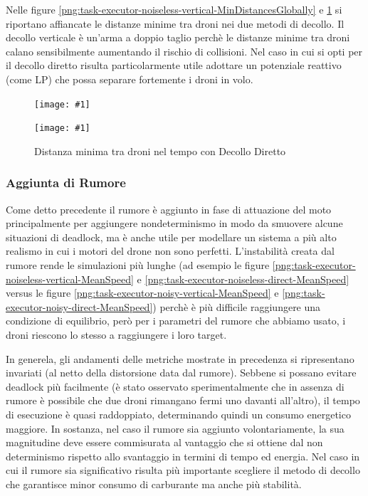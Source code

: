 \documentclass[a4paper,11pt,oneside, table]{article}
\newcommand{\putsubimage}[5] {
  \begin{minipage}{{#4}\linewidth}
	    \centering
      \texttt{[image: \#1]}
	    \caption{#2}\label{#3}
	\end{minipage}
}
\newcommand{\putimagecouple}[2] {
  \begin{figure}[!htb]
      \centering
      #1
      \hspace{0.5cm}
      #2
  \end{figure}
}
\begin{document}
Nelle figure \ref{png:task-executor-noiseless-vertical-MinDistancesGlobally} e \ref{png:task-executor-noiseless-direct-MinDistancesGlobally} si riportano affiancate le distanze minime tra droni nei due metodi di decollo.
Il decollo verticale \`e un'arma a doppio taglio perch\`e le distanze minime tra droni calano sensibilmente aumentando il rischio di collisioni.
Nel caso in cui si opti per il decollo diretto risulta particolarmente utile adottare un potenziale reattivo (come LP) che possa separare fortemente i droni in volo.

\putimagecouple
{\putsubimage{images/experiments/task-executor-noiseless-vertical/MinDistancesGlobally.png}{Distanza minima tra droni nel tempo con Decollo Verticale}{png:task-executor-noiseless-vertical-MinDistancesGlobally}{0.4}{0.99}}
{\putsubimage{images/experiments/task-executor-noiseless-direct/MinDistancesGlobally.png}{Distanza minima tra droni nel tempo con Decollo Diretto}{png:task-executor-noiseless-direct-MinDistancesGlobally}{0.4}{0.99}}

\subsubsection{Aggiunta di Rumore}

Come detto precedente il rumore \`e aggiunto in fase di attuazione del moto principalmente per aggiungere nondeterminismo in modo da smuovere alcune situazioni di deadlock, ma \`e anche utile per modellare un sistema a pi\`u alto realismo in cui i motori del drone non sono perfetti.
L'instabilit\`a creata dal rumore rende le simulazioni pi\`u lunghe (ad esempio le figure \ref{png:task-executor-noiseless-vertical-MeanSpeed} e \ref{png:task-executor-noiseless-direct-MeanSpeed} versus le figure \ref{png:task-executor-noisy-vertical-MeanSpeed} e \ref{png:task-executor-noisy-direct-MeanSpeed}) perch\`e \`e pi\`u difficile raggiungere una condizione di equilibrio, per\`o per i parametri del rumore che abbiamo usato, i droni riescono lo stesso a raggiungere i loro target.

In generela, gli andamenti delle metriche mostrate in precedenza si ripresentano invariati (al netto della distorsione data dal rumore).
Sebbene si possano evitare deadlock pi\`u facilmente (\`e stato osservato sperimentalmente che in assenza di rumore \`e possibile che due droni rimangano fermi uno davanti all'altro), il tempo di esecuzione \`e quasi raddoppiato, determinando quindi un consumo energetico maggiore.
In sostanza, nel caso il rumore sia aggiunto volontariamente, la sua magnitudine deve essere commisurata al vantaggio che si ottiene dal non determinismo rispetto allo svantaggio in termini di tempo ed energia.
Nel caso in cui il rumore sia significativo risulta pi\`u importante scegliere il metodo di decollo che garantisce minor consumo di carburante ma anche pi\`u stabilit\`a.
\end{document}
